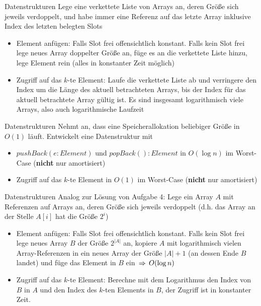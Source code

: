 \begin{frame}{Datenstrukturen} %
	\solutionheading
	Lege eine verkettete Liste von Arrays an, deren Größe sich jeweils verdoppelt, und habe immer eine Referenz auf das letzte Array inklusive Index des letzten belegten Slots
	\pause
	\begin{itemize}
		\item Element anfügen: Falls Slot frei \impl offensichtlich konstant. Falls kein Slot frei \impl lege neues Array doppelter Größe an, füge es an die verkettete Liste hinzu, lege Element rein (alles in konstanter Zeit möglich)
		\pause
		\item Zugriff auf das $k$-te Element: Laufe die verkettete Liste ab und verringere den Index um die Länge des aktuell betrachteten Arrays, bis der Index für das aktuell betrachtete Array gültig ist. Es sind insgesamt logarithmisch viele Arrays, also auch logarithmische Laufzeit
	\end{itemize}
\end{frame}



\begin{frame}{Datenstrukturen}
	Nehmt an, dass eine Speicherallokation beliebiger Größe in $O(1)$ läuft. Entwickelt eine Datenstruktur mit
	\begin{itemize}
		\item $pushBack(e : Element)$ und $popBack() : Element$ in $O(\log n)$ im Worst-Case (\textbf{nicht} nur amortisiert)
		\item Zugriff auf das $k$-te Element in $O(1)$ im Worst-Case (\textbf{nicht} nur amortisiert)
	\end{itemize}
\end{frame}

\begin{frame}{Datenstrukturen} %
	\solutionheading
	Analog zur Lösung von Aufgabe 4: Lege ein Array $A$ mit Referenzen auf Arrays an, deren Größe sich jeweils verdoppelt (d.h. das Array an der Stelle $A[i]$ hat die Größe $2^i$)
	\pause
	\begin{itemize}
		\item Element anfügen: Falls Slot frei \impl offensichtlich konstant. Falls kein Slot frei \impl lege neues Array $B$ der Größe $2^{|A|}$ an, kopiere $A$ mit logarithmisch vielen Array-Referenzen in ein neues Array der Größe $|A|+1$ (an dessen Ende $B$ landet) und füge das Element in $B$ ein $\impl O(\log n)$
		\pause
		\item Zugriff auf das $k$-te Element: Berechne mit dem Logarithmus den Index von $B$ in $A$ und den Index des $k$-ten Elements in $B$, der Zugriff ist in konstanter Zeit.
	\end{itemize}
\end{frame}


